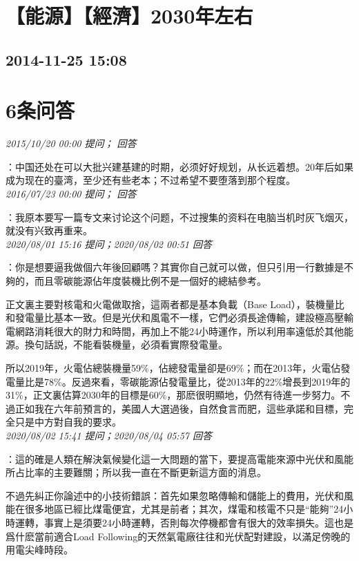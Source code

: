\documentclass[twocolumn]{ctexart}
\begin{document}
\section{【能源】【經濟】2030年左右}
\subsection{2014-11-25 15:08}


\section{6条问答}

\textit{\hfill\noindent\small 2015/10/20 00:00 提问； 回答}

：中国还处在可以大批兴建基建的时期，必须好好规划，从长远着想。20年后如果成为现在的臺湾，至少还有些老本；不过希望不要堕落到那个程度。\\

\textit{\hfill\noindent\small 2016/07/23 00:00 提问； 回答}

：我原本要写一篇专文来讨论这个问题，不过搜集的资料在电脑当机时灰飞烟灭，就没有兴致再重来。\\

\textit{\hfill\noindent\small 2020/08/01 15:16 提问；2020/08/02 00:51 回答}

：你是想要逼我做個六年後回顧嗎？其實你自己就可以做，但只引用一行數據是不夠的，而且零碳能源佔年度裝機比例不是一個好的總結參考。

正文裏主要對核電和火電做取捨，這兩者都是基本負載（Base Load），裝機量比和發電量比基本一致。但是光伏和風電不一樣，它們必須長途傳輸，建設極高壓輸電網路消耗很大的財力和時間，再加上不能24小時運作，所以利用率遠低於其他能源。換句話説，不能看裝機量，必須看實際發電量。

所以2019年，火電佔總裝機量59\%，佔總發電量卻是69\%；而在2013年，火電佔發電量比是78\%。反過來看，零碳能源佔發電量比，從2013年的22\%增長到2019年的31\%，正文裏估算2030年的目標是60\%，那麽很明顯地，仍然有待進一步努力。不過正如我在六年前預言的，美國人大選過後，自然食言而肥，這些承諾和目標，完全只是中方對自我的要求。
\\

\textit{\hfill\noindent\small 2020/08/02 15:41 提问；2020/08/04 05:57 回答}

：這的確是人類在解決氣候變化這一大問題的當下，要提高電能來源中光伏和風能所占比率的主要難關；所以我一直在不斷更新這方面的消息。

不過先糾正你論述中的小技術錯誤：首先如果忽略傳輸和儲能上的費用，光伏和風能在很多地區已經比煤電便宜，尤其是前者；其次，煤電和核電不只是“能夠”24小時運轉，事實上是須要24小時運轉，否則每次停機都會有很大的效率損失。這也是爲什麽當前適合Load Following的天然氣電廠往往和光伏配對建設，以滿足傍晚的用電尖峰時段。
\end{document}
